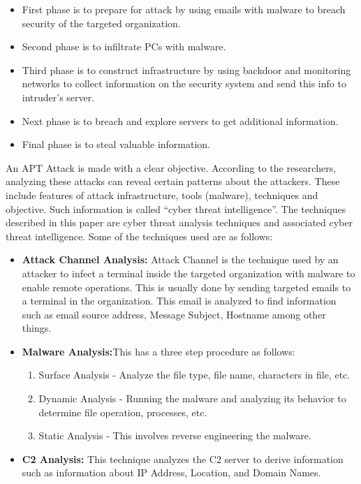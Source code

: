 \documentclass[11pt]{article}
\begin{document}
	\begin{itemize}
		\item First phase is to prepare for attack by using emails with malware to breach security of the targeted organization.
		\item Second phase is to infiltrate PCs with malware.
		\item Third phase is to construct infrastructure by using backdoor and monitoring networks to collect information on the security system and send this info to intruder’s server.
		\item Next phase is to breach and explore servers to get additional information.
		\item Final phase is to steal valuable information.
	\end{itemize}
	An APT Attack is made with a clear objective. According to the researchers, analyzing these attacks can reveal certain patterns about the attackers. These include features of attack infrastructure, tools (malware), techniques and objective. Such information is called “cyber threat intelligence”. The techniques described in this paper are cyber threat analysis techniques and associated cyber threat intelligence. Some of the techniques used are as follows:
	\begin{itemize}
		\item \textbf{Attack Channel Analysis:} Attack Channel is the technique used by an attacker to infect a terminal inside the targeted organization with malware to enable remote operations. This is usually done by sending targeted emails to a terminal in the organization. This email is analyzed to find information such as email source address, Message Subject, Hostname among other things.
		\item \textbf{Malware Analysis:}This has a three step procedure as follows:
		\begin{enumerate}
			\item Surface Analysis - Analyze the file type, file name, characters in file, etc.
			\item Dynamic Analysis - Running the malware and analyzing its behavior to determine file operation, processes, etc.
			\item Static Analysis - This involves reverse engineering the malware.
		\end{enumerate}
		\item \textbf{C2 Analysis:}  This technique analyzes the C2 server to derive information such as information about IP Address, Location, and Domain Names.
	\end{itemize}
\end{document}
